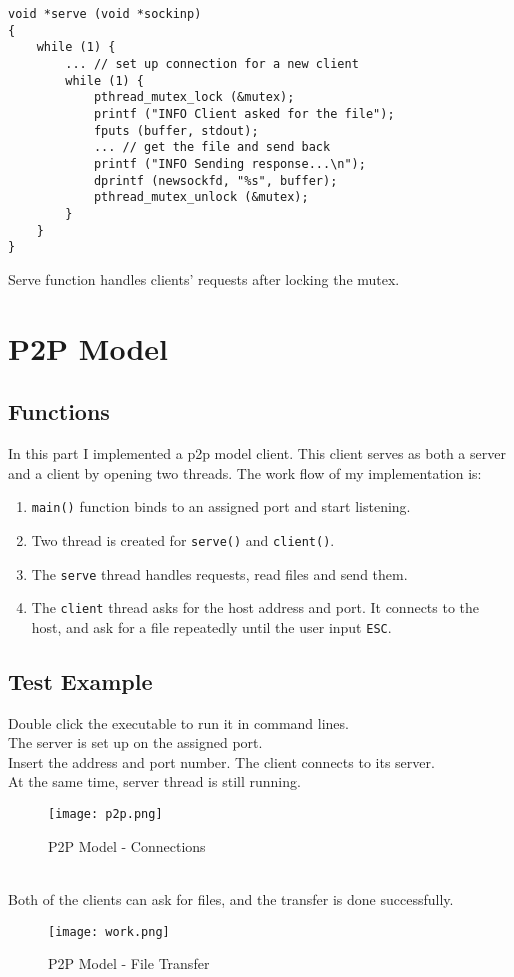 \documentclass[a4paper, 11pt]{article}
\begin{document}
{
\begin{lstlisting}
void *serve (void *sockinp)
{
    while (1) {
        ... // set up connection for a new client
        while (1) {
            pthread_mutex_lock (&mutex);
            printf ("INFO Client asked for the file");
            fputs (buffer, stdout);
            ... // get the file and send back
            printf ("INFO Sending response...\n");
            dprintf (newsockfd, "%s", buffer);
            pthread_mutex_unlock (&mutex);
        }
    }
}
\end{lstlisting}}
\begin{center}
Serve function handles clients' requests after locking the mutex.
\end{center}

\section*{P2P Model}
\subsection*{Functions}
In this part I implemented a p2p model client. This client serves as both a server and a client by opening two threads. 
The work flow of my implementation is:
\begin{enumerate}
    \item \texttt{main()} function binds to an assigned port and start listening.
    \item Two thread is created for \texttt{serve()} and \texttt{client()}.
    \item The \texttt{serve} thread handles requests, read files and send them.
    \item The \texttt{client} thread asks for the host address and port. It connects to the host, and ask for a file repeatedly until the user input \texttt{ESC}.
\end{enumerate}

\subsection*{Test Example}
Double click the executable to run it in command lines.\\
The server is set up on the assigned port.\\
Insert the address and port number. The client connects to its server.\\
At the same time, server thread is still running.
\begin{figure}[h]
\centering
\texttt{[image: p2p.png]}
\caption{P2P Model - Connections}
\end{figure}\\
Both of the clients can ask for files, and the transfer is done successfully.
\begin{figure}[h]
\centering
\texttt{[image: work.png]}
\caption{P2P Model - File Transfer}
\end{figure}
\end{document}
